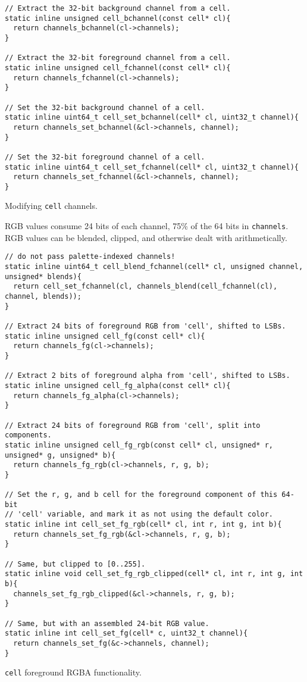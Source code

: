 \begin{listing}[!htb]
\begin{verbatim}
// Extract the 32-bit background channel from a cell.
static inline unsigned cell_bchannel(const cell* cl){
  return channels_bchannel(cl->channels);
}

// Extract the 32-bit foreground channel from a cell.
static inline unsigned cell_fchannel(const cell* cl){
  return channels_fchannel(cl->channels);
}

// Set the 32-bit background channel of a cell.
static inline uint64_t cell_set_bchannel(cell* cl, uint32_t channel){
  return channels_set_bchannel(&cl->channels, channel);
}

// Set the 32-bit foreground channel of a cell.
static inline uint64_t cell_set_fchannel(cell* cl, uint32_t channel){
  return channels_set_fchannel(&cl->channels, channel);
}
\end{verbatim}
\caption{Modifying \texttt{cell} channels.}
\label{listing:cellchannels}
\end{listing}

RGB values consume 24 bits of each channel, 75\% of the 64 bits in \texttt{channels}.
RGB values can be blended, clipped, and otherwise dealt with arithmetically.

\begin{listing}[!htb]
\begin{verbatim}
// do not pass palette-indexed channels!
static inline uint64_t cell_blend_fchannel(cell* cl, unsigned channel, unsigned* blends){
  return cell_set_fchannel(cl, channels_blend(cell_fchannel(cl), channel, blends));
}

// Extract 24 bits of foreground RGB from 'cell', shifted to LSBs.
static inline unsigned cell_fg(const cell* cl){
  return channels_fg(cl->channels);
}

// Extract 2 bits of foreground alpha from 'cell', shifted to LSBs.
static inline unsigned cell_fg_alpha(const cell* cl){
  return channels_fg_alpha(cl->channels);
}

// Extract 24 bits of foreground RGB from 'cell', split into components.
static inline unsigned cell_fg_rgb(const cell* cl, unsigned* r, unsigned* g, unsigned* b){
  return channels_fg_rgb(cl->channels, r, g, b);
}

// Set the r, g, and b cell for the foreground component of this 64-bit
// 'cell' variable, and mark it as not using the default color.
static inline int cell_set_fg_rgb(cell* cl, int r, int g, int b){
  return channels_set_fg_rgb(&cl->channels, r, g, b);
}

// Same, but clipped to [0..255].
static inline void cell_set_fg_rgb_clipped(cell* cl, int r, int g, int b){
  channels_set_fg_rgb_clipped(&cl->channels, r, g, b);
}

// Same, but with an assembled 24-bit RGB value.
static inline int cell_set_fg(cell* c, uint32_t channel){
  return channels_set_fg(&c->channels, channel);
}
\end{verbatim}
\caption{\texttt{cell} foreground RGBA functionality.}
\label{listing:cellrgbfg}
\end{listing}

